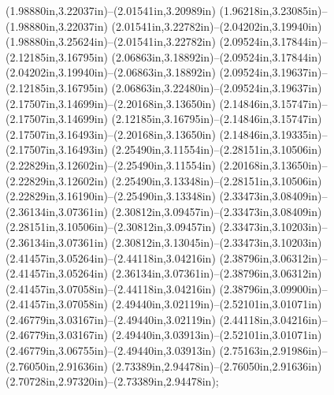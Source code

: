 (1.98880in,3.22037in)--(2.01541in,3.20989in) (1.96218in,3.23085in)--(1.98880in,3.22037in) (2.01541in,3.22782in)--(2.04202in,3.19940in) (1.98880in,3.25624in)--(2.01541in,3.22782in) (2.09524in,3.17844in)--(2.12185in,3.16795in) (2.06863in,3.18892in)--(2.09524in,3.17844in) (2.04202in,3.19940in)--(2.06863in,3.18892in) (2.09524in,3.19637in)--(2.12185in,3.16795in) (2.06863in,3.22480in)--(2.09524in,3.19637in) (2.17507in,3.14699in)--(2.20168in,3.13650in) (2.14846in,3.15747in)--(2.17507in,3.14699in) (2.12185in,3.16795in)--(2.14846in,3.15747in) (2.17507in,3.16493in)--(2.20168in,3.13650in) (2.14846in,3.19335in)--(2.17507in,3.16493in) (2.25490in,3.11554in)--(2.28151in,3.10506in) (2.22829in,3.12602in)--(2.25490in,3.11554in) (2.20168in,3.13650in)--(2.22829in,3.12602in) (2.25490in,3.13348in)--(2.28151in,3.10506in) (2.22829in,3.16190in)--(2.25490in,3.13348in) (2.33473in,3.08409in)--(2.36134in,3.07361in) (2.30812in,3.09457in)--(2.33473in,3.08409in) (2.28151in,3.10506in)--(2.30812in,3.09457in) (2.33473in,3.10203in)--(2.36134in,3.07361in) (2.30812in,3.13045in)--(2.33473in,3.10203in) (2.41457in,3.05264in)--(2.44118in,3.04216in) (2.38796in,3.06312in)--(2.41457in,3.05264in) (2.36134in,3.07361in)--(2.38796in,3.06312in) (2.41457in,3.07058in)--(2.44118in,3.04216in) (2.38796in,3.09900in)--(2.41457in,3.07058in) (2.49440in,3.02119in)--(2.52101in,3.01071in) (2.46779in,3.03167in)--(2.49440in,3.02119in) (2.44118in,3.04216in)--(2.46779in,3.03167in) (2.49440in,3.03913in)--(2.52101in,3.01071in) (2.46779in,3.06755in)--(2.49440in,3.03913in) (2.75163in,2.91986in)--(2.76050in,2.91636in) (2.73389in,2.94478in)--(2.76050in,2.91636in) (2.70728in,2.97320in)--(2.73389in,2.94478in);

